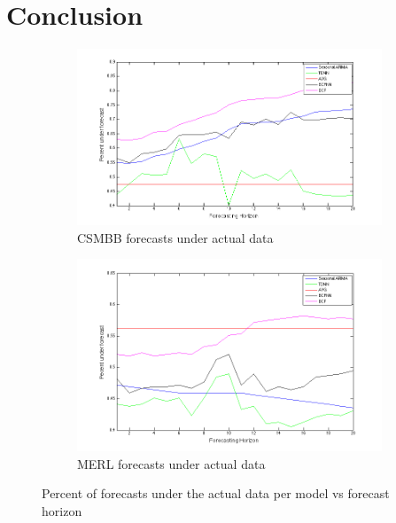 \documentclass{acm_proc_article-sp}
\begin{document}
\section{Conclusion}

\begin{figure}[t!]
\centering
\begin{subfigure}{.45\textwidth}
  \centering
  \includegraphics[width=1.0\linewidth]{brown_ou.png}
  \caption{CSMBB forecasts under actual data}
  \label{fig:csmou}
\end{subfigure}
\begin{subfigure}{.45\textwidth}
  \centering
  \includegraphics[width=1.0\linewidth]{merl_ou.png}
  \caption{MERL forecasts under actual data}
  \label{fig:merlou}
\end{subfigure}
\caption{Percent of forecasts under the actual data per model vs forecast horizon}
\label{fig:ouplot}
\end{figure}


 
\balancecolumns
\end{document}
